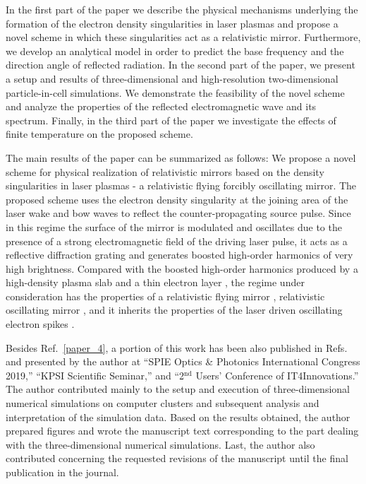 \documentclass[10pt, a4paper, twoside, openright]{report}
\newcommand{\q}[1]{``#1''} %
\begin{document}

In the first part of the paper we describe the physical mechanisms underlying the formation of the electron density singularities in laser plasmas and propose a novel scheme in which these singularities act as a relativistic mirror. Furthermore, we develop an analytical model in order to predict the base frequency and the direction angle of reflected radiation. In the second part of the paper, we present a setup and results of three-dimensional and high-resolution two-dimensional particle-in-cell simulations. We demonstrate the feasibility of the novel scheme and analyze the properties of the reflected electromagnetic wave and its spectrum. Finally, in the third part of the paper we investigate the effects of finite temperature on the proposed scheme.

The main results of the paper can be summarized as follows: We propose a novel scheme for physical realization of relativistic mirrors based on the density singularities in laser plasmas - a relativistic flying forcibly oscillating mirror. The proposed scheme uses the electron density singularity at the joining area of the laser wake and bow waves to reflect the counter-propagating source pulse. Since in this regime the surface of the mirror is modulated and oscillates due to the presence of a strong electromagnetic field of the driving laser pulse, it acts as a reflective diffraction grating and generates boosted high-order harmonics of very high brightness. Compared with the boosted high-order harmonics produced by a high-density plasma slab and a thin electron layer \cite{Kulagin2007, Esirkepov2009, Wu2010}, the regime under consideration has the properties of a relativistic flying mirror \cite{Bulanov2003}, relativistic oscillating mirror \cite{Bulanov1994, Naumova2004}, and it inherits the properties of the laser driven oscillating electron spikes \cite{Pirozhkov2014, Pirozhkov2017}. 

Besides Ref.~\ref{paper_4}, a portion of this work has been also published in Refs.~ and presented by the author at \q{SPIE Optics \& Photonics International Congress 2019,} \q{KPSI Scientific Seminar,} and \q{2$ ^{\mathrm{nd}} $ Users' Conference of IT4Innovations.} The author contributed mainly to the setup and execution of three-dimensional numerical simulations on computer clusters and subsequent analysis and interpretation of the simulation data. Based on the results obtained, the author prepared figures and wrote the manuscript text corresponding to the part dealing with the three-dimensional numerical simulations. Last, the author also contributed concerning the requested revisions of the manuscript until the final publication in the journal.
\end{document}
